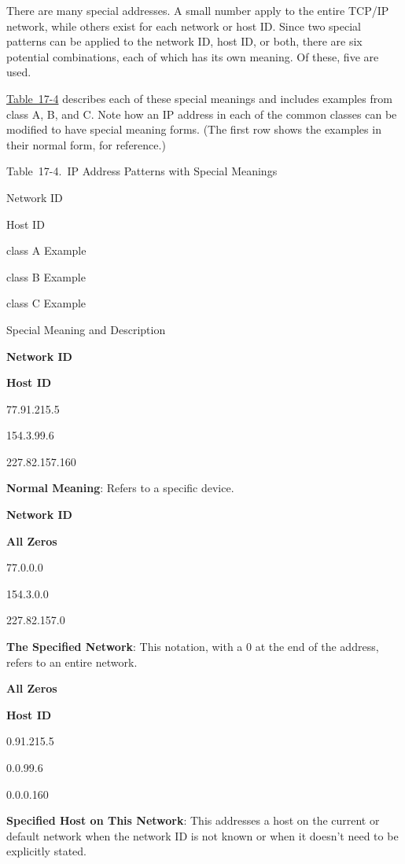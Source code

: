 \documentclass[b5paper,11pt]{memoir}
\begin{document}
There are many special addresses. A small number apply to the entire
TCP/IP network, while others exist for each network or host ID. Since
two special patterns can be applied to the network ID, host ID, or both,
there are six potential combinations, each of which has its own meaning.
Of these, five are used.

\protect\hyperlink{ch17s04.htmlux5cux23ip_address_patterns_with_special_meaning}{Table~17-4}
describes each of these special meanings and includes examples from
class A, B, and C. Note how an IP address in each of the common classes
can be modified to have special meaning forms. (The first row shows the
examples in their normal form, for reference.)

\protect\hypertarget{ch17s04.htmlux5cux23ip_address_patterns_with_special_meaning}{}{}

Table~17-4.~IP Address Patterns with Special Meanings

Network ID

Host ID

class A Example

class B Example

class C Example

Special Meaning and Description

{\textbf{Network ID}}

{\textbf{Host ID}}

77.91.215.5

154.3.99.6

227.82.157.160

{\textbf{Normal Meaning}}: Refers to a specific device.

{\textbf{Network ID}}

{\textbf{All Zeros}}

77.0.0.0

154.3.0.0

227.82.157.0

{\textbf{The Specified Network}}: This notation,
\protect\hypertarget{ch17s04.htmlux5cux23idx-CHP-17-0696}{}{}with a 0 at
the end of the address, refers to an entire network.

{\textbf{All Zeros}}

{\textbf{Host ID}}

0.91.215.5

0.0.99.6

0.0.0.160

{\textbf{Specified Host on This Network}}: This addresses a host on the
current or default network when the network ID is not known or when it
doesn't need to be explicitly stated.
\end{document}
